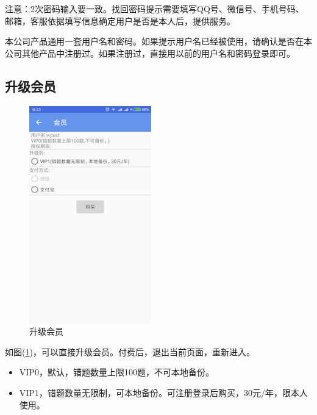 注意：2次密码输入要一致。找回密码提示需要填写QQ号、微信号、手机号码、邮箱，客服依据填写信息确定用户是否是本人后，提供服务。

本公司产品通用一套用户名和密码。如果提示用户名已经被使用，请确认是否在本公司其他产品中注册过。如果注册过，直接用以前的用户名和密码登录即可。

\subsection{升级会员}
\begin{figure}[H]
	\centering
	\includegraphics{img/29.png}
	\caption{升级会员}
	\label{img29}
\end{figure}
如图(\ref{img29})，可以直接升级会员。付费后，退出当前页面，重新进入。

\begin{itemize}
	\item VIP0，默认，错题数量上限100题，不可本地备份。
	\item VIP1，错题数量无限制，可本地备份。可注册登录后购买，30元/年，限本人使用。
\end{itemize}

